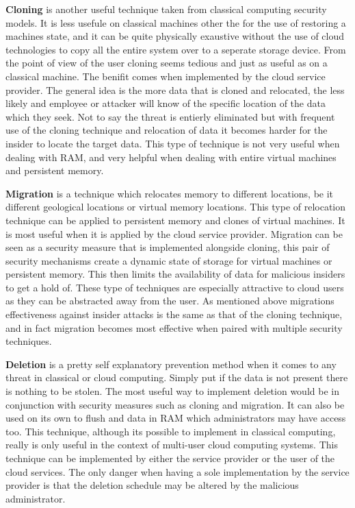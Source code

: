 \label{llCloning}

\textbf{Cloning} is another useful technique taken from classical computing security models. It is less usefule on classical machines other the for the use of restoring a machines state, and it can be quite physically exaustive without the use of cloud technologies to copy all the entire system over to a seperate storage device. From the point of view of the user cloning seems tedious and just as useful as on a classical machine. The benifit comes when implemented by the cloud service provider. \cite{kandias} The general idea is the more data that is cloned and relocated, the less likely and employee or attacker will know of the specific location of the data which they seek. Not to say the threat is entierly eliminated but with frequent use of the cloning technique and relocation of data it becomes harder for the insider to locate the target data. \cite{szefer} This type of technique is not very useful when dealing with RAM, and very helpful when dealing with entire virtual machines and persistent memory.

\label{llMigration}

\textbf{Migration} is a technique which relocates memory to different locations, be it different geological locations or virtual memory locations. This type of relocation technique can be applied to persistent memory and clones of virtual machines. It is most useful when it is applied by the cloud service provider. \cite{kandias} Migration can be seen as a security measure that is implemented alongside cloning, this pair of security mechanisms create a dynamic state of storage for virtual machines or persistent memory. This then limits the availability of data for malicious insiders to get a hold of. These type of techniques are especially attractive to cloud users as they can be abstracted away from the user. \cite{szefer} As mentioned above migrations effectiveness against insider attacks is the same as that of the cloning technique, and in fact migration becomes most effective when paired with multiple security techniques.

\label{llDeletion}

\textbf{Deletion} is a pretty self explanatory prevention method when it comes to any threat in classical or cloud computing. Simply put if the data is not present there is nothing to be stolen. \cite{kandias}\cite{subashini} The most useful way to implement deletion would be in conjunction with security measures such as cloning and migration. \cite{szefer} It can also be used on its own to flush and data in RAM which administrators may have access too. This technique, although its possible to implement in classical computing, really is only useful in the context of multi-user cloud computing systems. This technique can be implemented by either the service provider or the user of the cloud services. The only danger when having a sole implementation by the service provider is that the deletion schedule may be altered by the malicious administrator. \cite{sabahi}
